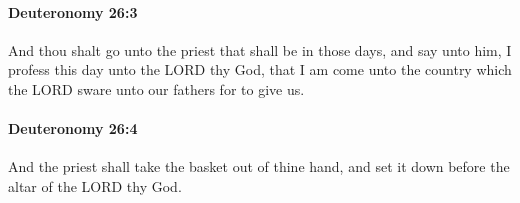 		\paragraph{Deuteronomy 26:3} %
			\label{DEUTERONOMY-26-3}

			And thou shalt go unto the priest that shall be in those days, and say unto him, I profess this day unto the LORD thy God, that I am come unto the country which the LORD sware unto our fathers for to give us.


		\paragraph{Deuteronomy 26:4} %
			\label{DEUTERONOMY-26-4}

			And the priest shall take the basket out of thine hand, and set it down before the altar of the LORD thy God.


